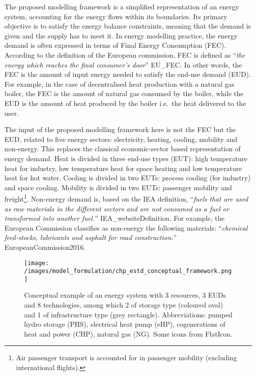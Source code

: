 \documentclass[
]{article}
\begin{document}
The proposed modelling framework is a simplified representation of an
energy system, accounting for the energy flows within its boundaries.
Its primary objective is to satisfy the energy balance constraints,
meaning that the demand is given and the supply has to meet it. In
energy modelling practice, the energy demand is often expressed in terms
of Final Energy Consumption (FEC). According to the definition of the
European commission, FEC is defined as ``\emph{the energy which reaches
the final consumer's door}'' EU\_FEC. In other words, the FEC is the
amount of input energy needed to satisfy the end-use demand (EUD). For
example, in the case of decentralised heat production with a natural gas
boiler, the FEC is the amount of natural gas consumed by the boiler,
while the EUD is the amount of heat produced by the boiler i.e.~the heat
delivered to the user.

The input of the proposed modelling framework here is not the FEC but
the EUD, related to five energy sectors: electricity, heating, cooling,
mobility and non-energy. This replaces the classical economic-sector
based representation of energy demand. Heat is divided in three end-use
types (EUT): high temperature heat for industry, low temperature heat
for space heating and low temperature heat for hot water. Cooling is
divided in two EUTs: process cooling (for industry) and space cooling.
Mobility is divided in two EUTs: passenger mobility and
freight\footnote{Air passenger transport is accounted for in passenger
  mobility (excluding international flights).}. Non-energy demand is,
based on the IEA definition, ``\emph{fuels that are used as raw
materials in the different sectors and are not consumed as a fuel or
transformed into another fuel.}'' IEA\_websiteDefinition. For example,
the European Commission classifies as non-energy the following
materials: ``\emph{chemical feed-stocks, lubricants and asphalt for road
construction.}'' EuropeanCommission2016.

\begin{figure}
\centering
\texttt{[image: /images/model\_formulation/chp\_estd\_conceptual\_framework.png]}
\caption{Conceptual example of an energy system with 3 resources, 3 EUDs
and 8 technologies, among which 2 of storage type (coloured oval) and 1
of infrastructure type (grey rectangle). Abbreviations: pumped hydro
storage (PHS), electrical heat pump (eHP), cogenerations of heat and
power (CHP), natural gas (NG). Some icons from FlatIcon.}
\end{figure}
\end{document}
